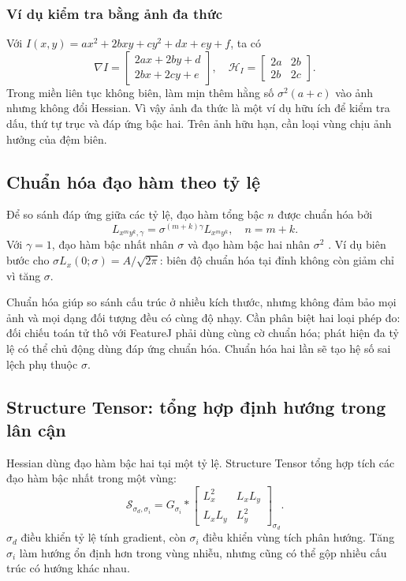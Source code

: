 \subsubsection{Ví dụ kiểm tra bằng ảnh đa thức}
Với $I(x,y)=ax^2+2bxy+cy^2+dx+ey+f$, ta có
\begin{equation}
\nabla I=\begin{bmatrix}2ax+2by+d\\2bx+2cy+e\end{bmatrix},
\quad
\mathcal H_I=\begin{bmatrix}2a&2b\\2b&2c\end{bmatrix}.
\end{equation}
Trong miền liên tục không biên, làm mịn thêm hằng số $\sigma^2(a+c)$ vào ảnh nhưng không đổi Hessian. Vì vậy ảnh đa thức là một ví dụ hữu ích để kiểm tra dấu, thứ tự trục và đáp ứng bậc hai. Trên ảnh hữu hạn, cần loại vùng chịu ảnh hưởng của đệm biên.

\subsection{Chuẩn hóa đạo hàm theo tỷ lệ}
Để so sánh đáp ứng giữa các tỷ lệ, đạo hàm tổng bậc $n$ được chuẩn hóa bởi
\begin{equation}
L_{x^my^k,\gamma}=\sigma^{(m+k)\gamma}L_{x^my^k},\quad n=m+k.
\end{equation}
Với $\gamma=1$, đạo hàm bậc nhất nhân $\sigma$ và đạo hàm bậc hai nhân $\sigma^2$ \cite{lindeberg1998feature}. Ví dụ biên bước cho $\sigma L_x(0;\sigma)=A/\sqrt{2\pi}$: biên độ chuẩn hóa tại đỉnh không còn giảm chỉ vì tăng $\sigma$.

Chuẩn hóa giúp so sánh cấu trúc ở nhiều kích thước, nhưng không đảm bảo mọi ảnh và mọi dạng đối tượng đều có cùng độ nhạy. Cần phân biệt hai loại phép đo: đối chiếu toán tử thô với FeatureJ phải dùng cùng cờ chuẩn hóa; phát hiện đa tỷ lệ có thể chủ động dùng đáp ứng chuẩn hóa. Chuẩn hóa hai lần sẽ tạo hệ số sai lệch phụ thuộc $\sigma$.

\subsection{Structure Tensor: tổng hợp định hướng trong lân cận}
Hessian dùng đạo hàm bậc hai tại một tỷ lệ. Structure Tensor tổng hợp tích các đạo hàm bậc nhất trong một vùng:
\begin{equation}
\mathcal S_{\sigma_d,\sigma_i}
=G_{\sigma_i}*
\begin{bmatrix}
L_x^2&L_xL_y\\L_xL_y&L_y^2
\end{bmatrix}_{\sigma_d}.
\end{equation}
$\sigma_d$ điều khiển tỷ lệ tính gradient, còn $\sigma_i$ điều khiển vùng tích phân hướng. Tăng $\sigma_i$ làm hướng ổn định hơn trong vùng nhiễu, nhưng cũng có thể gộp nhiều cấu trúc có hướng khác nhau.

